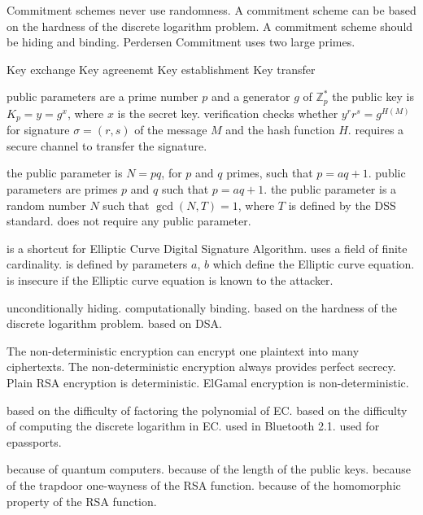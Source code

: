  {Commitment schemes never use randomness.}
 {A commitment scheme can be based on the hardness of the discrete logarithm problem.}
 {A commitment scheme should be hiding and binding.}
 {Perdersen Commitment uses two large primes.}
 
{Key exchange}
{Key agreenemt}
{Key establishment}
{Key transfer}

{public parameters are a prime number $p$ and a generator $g$ of $\mathbb{Z}_p^*$}
{the public key is $K_p = y = g^x$, where $x$ is the secret key.}
{verification checks whether $y^rr^s=g^{H(M)}$ for signature $\sigma=(r, s)$ of the message $M$ and the hash function $H$.}
{requires a secure channel to transfer the signature.}

{the public parameter is $N = pq$, for $p$ and $q$ primes, such that $p=aq + 1$.}
{public parameters are primes $p$ and $q$ such that $p=aq + 1$.}
{the public parameter is a random number $N$ such that $\gcd(N, T) = 1$, where $T$ is defined by the DSS standard.}
{does not require any public parameter.}

{is a shortcut for Elliptic Curve Digital Signature Algorithm.}
{uses a field of finite cardinality.}
{is defined by parameters $a$, $b$ which define the Elliptic curve equation.}
{is insecure if the Elliptic curve equation is known to the attacker.}

{unconditionally hiding.}
{computationally binding.}
{based on the hardness of the discrete logarithm problem.}
{based on DSA.}

{The non-deterministic encryption can encrypt one plaintext into many ciphertexts.}
{The non-deterministic encryption always provides perfect secrecy.}
{Plain RSA encryption is deterministic.}
{ElGamal encryption is non-deterministic.}

{based on the difficulty of factoring the polynomial of EC.}
{based on the difficulty of computing the discrete logarithm in EC.}
{used in Bluetooth 2.1.}
{used for epassports.}

{because of quantum computers.}
{because of the length of the public keys.}
{because of the trapdoor one-wayness of the RSA function.}
{because of the homomorphic property of the RSA function.}

